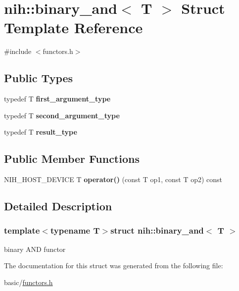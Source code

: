 \hypertarget{structnih_1_1binary__and}{
\section{nih\-:\-:binary\-\_\-and$<$ \-T $>$ \-Struct \-Template \-Reference}
\label{structnih_1_1binary__and}
}


{\ttfamily \#include $<$functors.\-h$>$}

\subsection*{\-Public \-Types}
\begin{DoxyCompactItemize}
\item 
\hypertarget{structnih_1_1binary__and_adf198304468e597f05bb53ddce5dd0ef}{
typedef \-T {\bfseries first\-\_\-argument\-\_\-type}}
\label{structnih_1_1binary__and_adf198304468e597f05bb53ddce5dd0ef}

\item 
\hypertarget{structnih_1_1binary__and_ae2f9800f7c37b358ffd14994bb258f85}{
typedef \-T {\bfseries second\-\_\-argument\-\_\-type}}
\label{structnih_1_1binary__and_ae2f9800f7c37b358ffd14994bb258f85}

\item 
\hypertarget{structnih_1_1binary__and_a56f25c31fcb0c18e65ff47d287c6d526}{
typedef \-T {\bfseries result\-\_\-type}}
\label{structnih_1_1binary__and_a56f25c31fcb0c18e65ff47d287c6d526}

\end{DoxyCompactItemize}
\subsection*{\-Public \-Member \-Functions}
\begin{DoxyCompactItemize}
\item 
\hypertarget{structnih_1_1binary__and_a32d4d58a96e8a11e607dd77fa213b7f4}{
\-N\-I\-H\-\_\-\-H\-O\-S\-T\-\_\-\-D\-E\-V\-I\-C\-E \-T {\bfseries operator()} (const \-T op1, const \-T op2) const }
\label{structnih_1_1binary__and_a32d4d58a96e8a11e607dd77fa213b7f4}

\end{DoxyCompactItemize}


\subsection{\-Detailed \-Description}
\subsubsection*{template$<$typename T$>$struct nih\-::binary\-\_\-and$<$ T $>$}

binary \-A\-N\-D functor 

\-The documentation for this struct was generated from the following file\-:\begin{DoxyCompactItemize}
\item 
basic/\hyperlink{functors_8h}{functors.\-h}\end{DoxyCompactItemize}
